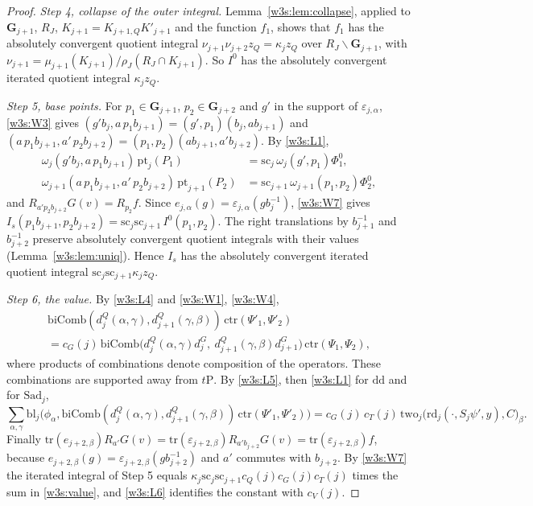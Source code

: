 \begin{proof}
\emph{Step 4, collapse of the outer integral.} Lemma~\ref{w3s:lem:collapse}, applied to $\mathbf G_{j+1}$, $R_J$, $K_{j+1}=K_{j+1,Q}K'_{j+1}$ and the function $f_1$, shows that $f_1$ has the absolutely convergent quotient integral $\nu_{j+1}\nu_{j+2}z_Q=\kappa_jz_Q$ over $R_J\backslash\mathbf G_{j+1}$, with $\nu_{j+1}=\mu_{j+1}(K_{j+1})/\rho_J(R_J\cap K_{j+1})$. So $I^0$ has the absolutely convergent iterated quotient integral $\kappa_jz_Q$.

\emph{Step 5, base points.} For $p_1\in\mathbf G_{j+1}$, $p_2\in\mathbf G_{j+2}$ and $g'$ in the support of $\varepsilon_{j,\alpha}$, \ref{w3s:W3} gives $(g'b_j,a\,p_1b_{j+1})=(g',p_1)(b_j,ab_{j+1})$ and $(a\,p_1b_{j+1},a'\,p_2b_{j+2})=(p_1,p_2)(ab_{j+1},a'b_{j+2})$. By \ref{w3s:L1},
\begin{align*}
\omega_j(g'b_j,a\,p_1b_{j+1})\,\mathrm{pt}_j(P_1)&=\mathrm{sc}_j\,\omega_j(g',p_1)\Phi^0_1,\\
\omega_{j+1}(a\,p_1b_{j+1},a'\,p_2b_{j+2})\,\mathrm{pt}_{j+1}(P_2)&=\mathrm{sc}_{j+1}\,\omega_{j+1}(p_1,p_2)\Phi^0_2,
\end{align*}
and $R_{a'p_2b_{j+2}}G(v)=R_{p_2}f$. Since $e_{j,\alpha}(g)=\varepsilon_{j,\alpha}(gb_j^{-1})$, \ref{w3s:W7} gives $I_s(p_1b_{j+1},p_2b_{j+2})=\mathrm{sc}_j\mathrm{sc}_{j+1}\,I^0(p_1,p_2)$. The right translations by $b_{j+1}^{-1}$ and $b_{j+2}^{-1}$ preserve absolutely convergent quotient integrals with their values (Lemma~\ref{w3s:lem:uniq}). Hence $I_s$ has the absolutely convergent iterated quotient integral $\mathrm{sc}_j\mathrm{sc}_{j+1}\kappa_jz_Q$.

\emph{Step 6, the value.} By \ref{w3s:L4} and \ref{w3s:W1}, \ref{w3s:W4},
\begin{multline*}
\mathrm{biComb}(d^Q_j(\alpha,\gamma),d^Q_{j+1}(\gamma,\beta))\,\mathrm{ctr}(\Psi'_1,\Psi'_2)\\
=c_G(j)\,\mathrm{biComb}\bigl(d^Q_j(\alpha,\gamma)d^G_j,\ d^Q_{j+1}(\gamma,\beta)d^G_{j+1}\bigr)\,\mathrm{ctr}(\Psi_1,\Psi_2),
\end{multline*}
where products of combinations denote composition of the operators. These combinations are supported away from $t\mathrm P$. By \ref{w3s:L5}, then \ref{w3s:L1} for $\mathrm{dd}$ and for $\mathrm{Sad}_j$,
\[
\sum_{\alpha,\gamma}\mathrm{bl}_j\bigl(\phi_\alpha,\mathrm{biComb}(d^Q_j(\alpha,\gamma),d^Q_{j+1}(\gamma,\beta))\,\mathrm{ctr}(\Psi'_1,\Psi'_2)\bigr)=c_G(j)\,c_T(j)\,\mathrm{two}_j\bigl(\mathrm{rd}_j(\cdot,S_j\psi',y),C\bigr)_\beta .
\]
Finally $\mathrm{tr}(e_{j+2,\beta})R_{a'}G(v)=\mathrm{tr}(\varepsilon_{j+2,\beta})R_{a'b_{j+2}}G(v)=\mathrm{tr}(\varepsilon_{j+2,\beta})f$, because $e_{j+2,\beta}(g)=\varepsilon_{j+2,\beta}(gb_{j+2}^{-1})$ and $a'$ commutes with $b_{j+2}$. By \ref{w3s:W7} the iterated integral of Step 5 equals $\kappa_j\mathrm{sc}_j\mathrm{sc}_{j+1}c_Q(j)c_G(j)c_T(j)$ times the sum in \eqref{w3s:value}, and \ref{w3s:L6} identifies the constant with $c_V(j)$.
\end{proof}

